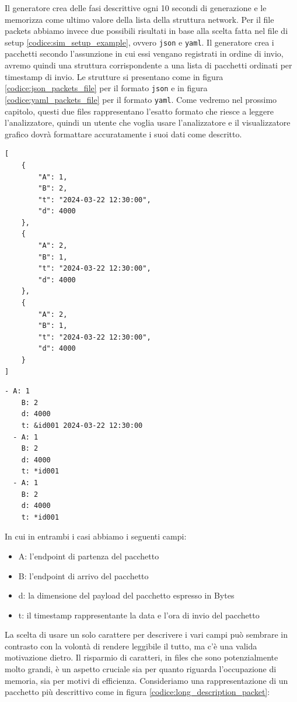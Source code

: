 \documentclass[binding=0.6cm]{sapthesis}
\begin{document}
Il generatore crea delle fasi descrittive ogni 10 secondi di generazione e le memorizza come ultimo valore della lista della struttura network.
Per il file packets abbiamo invece due possibili risultati in base alla scelta fatta nel file di setup \ref{codice:sim_setup_example}, ovvero \texttt{json} e \texttt{yaml}.
Il generatore crea i pacchetti secondo l'assunzione in cui essi vengano registrati in ordine di invio, avremo quindi una struttura corrispondente
a una lista di pacchetti ordinati per timestamp di invio.
Le strutture si presentano come in figura \ref{codice:json_packets_file} per il formato \texttt{json} e in figura \ref{codice:yaml_packets_file} per il formato \texttt{yaml}.
Come vedremo nel prossimo capitolo, questi due files rappresentano l'esatto formato che riesce a leggere l'analizzatore, quindi un utente
che voglia usare l'analizzatore e il visualizzatore grafico dovrà formattare accuratamente i suoi dati come descritto.

{\scriptsize %
\begin{lstlisting}[caption={Esempio di packets file in formato \texttt{json}}, label={codice:json_packets_file}]
[
    {
        "A": 1,
        "B": 2,
        "t": "2024-03-22 12:30:00",
        "d": 4000
    },
    {
        "A": 2,
        "B": 1,
        "t": "2024-03-22 12:30:00",
        "d": 4000
    },
    {
        "A": 2,
        "B": 1,
        "t": "2024-03-22 12:30:00",
        "d": 4000
    }
]
\end{lstlisting}
}

{\scriptsize %
\begin{lstlisting}[caption={Esempio di packets file in formato \texttt{yaml}}, label={codice:yaml_packets_file}]
  - A: 1
    B: 2
    d: 4000
    t: &id001 2024-03-22 12:30:00
  - A: 1
    B: 2
    d: 4000
    t: *id001
  - A: 1
    B: 2
    d: 4000
    t: *id001
\end{lstlisting}
}

In cui in entrambi i casi abbiamo i seguenti campi:
\begin{itemize}
    \item A: l'endpoint di partenza del pacchetto
    \item B: l'endpoint di arrivo del pacchetto
    \item d: la dimensione del payload del pacchetto espresso in Bytes
    \item t: il timestamp rappresentante la data e l'ora di invio del pacchetto
\end{itemize}
La scelta di usare un solo carattere per descrivere i vari campi può sembrare in contrasto con la volontà di rendere leggibile il tutto,
ma c'è una valida motivazione dietro. Il risparmio di caratteri, in files che sono potenzialmente molto grandi, è un aspetto cruciale sia per quanto
riguarda l'occupazione di memoria, sia per motivi di efficienza. Consideriamo una rappresentazione di un pacchetto più descrittivo come in figura \ref{codice:long_description_packet}:
\end{document}
